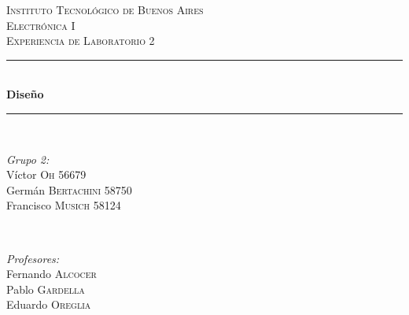 \begin{titlepage}
    \newcommand{\HRule}{\rule{\linewidth}{0.5mm}}
    \center
    \textsc{\LARGE Instituto Tecnológico de Buenos Aires}\\[1.2cm]
    \textsc{\Large Electrónica I}\\[0.5cm]
    \textsc{\large Experiencia de Laboratorio 2}\\[0.5cm]
    
    \HRule \\[0.4cm]
    { \huge \bfseries  Diseño}\\[0.4cm] %
    \HRule \\[1.5cm]
    
    
    \begin{minipage}{0.4\textwidth}
    \begin{flushleft} \large
    \emph{Grupo 2:}\\
    Víctor \textsc{Oh} 56679\\
    Germán \textsc{Bertachini}  58750\\
    Francisco \textsc{Musich} 58124\\
    \end{flushleft}
    \end{minipage}
    ~
    \begin{minipage}{0.4\textwidth}
    \begin{flushright} \large
    \emph{Profesores:} \\
    Fernando \textsc{Alcocer}\\
    Pablo \textsc{Gardella}\\
    Eduardo \textsc{Oreglia}
    \end{flushright}
    \end{minipage}\\[4cm]
    
    \vfill %
\end{titlepage}